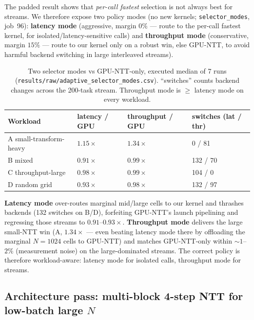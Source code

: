 \documentclass[11pt,a4paper]{article}
\begin{document}
The padded result shows that \emph{per-call fastest} selection is not always best for streams. We
therefore expose two policy modes (no new kernels; \texttt{selector\_modes}, job~96):
\textbf{latency mode} (aggressive, margin $0\%$ --- route to the per-call fastest kernel, for
isolated/latency-sensitive calls) and \textbf{throughput mode} (conservative, margin $15\%$ ---
route to our kernel only on a robust win, else GPU-NTT, to avoid harmful backend switching in large
interleaved streams).

\begin{table}[h]
\centering
\caption{Two selector modes vs GPU-NTT-only, executed median of 7 runs
(\texttt{results/raw/adaptive\_selector\_modes.csv}). ``switches'' counts backend changes across the
200-task stream. Throughput mode is $\ge$ latency mode on every workload.}
\begin{tabular}{L{3.8cm}R{2.2cm}R{2.4cm}R{2.6cm}}
\toprule
Workload & latency / GPU & throughput / GPU & switches (lat / thr) \\
\midrule
A small-transform-heavy & $1.15\times$ & $\mathbf{1.34\times}$ & 0 / 81 \\
B mixed                  & $0.91\times$ & $0.99\times$ & 132 / 70 \\
C throughput-large       & $0.98\times$ & $0.99\times$ & 104 / 0 \\
D random grid            & $0.93\times$ & $0.98\times$ & 132 / 97 \\
\bottomrule
\end{tabular}
\end{table}

\textbf{Latency mode} over-routes marginal mid/large cells to our kernel and thrashes backends (132
switches on B/D), forfeiting GPU-NTT's launch pipelining and regressing those streams to
$0.91$--$0.93\times$. \textbf{Throughput mode} delivers the large small-NTT win (A, $1.34\times$ ---
even beating latency mode there by offloading the marginal $N{=}1024$ cells to GPU-NTT) and matches
GPU-NTT-only within ${\sim}1$--$2\%$ (measurement noise) on the large-dominated streams. The correct
policy is therefore workload-aware: latency mode for isolated calls, throughput mode for streams.

\subsection{Architecture pass: multi-block 4-step NTT for low-batch large $N$}
\label{sec:multiblock}
\end{document}

